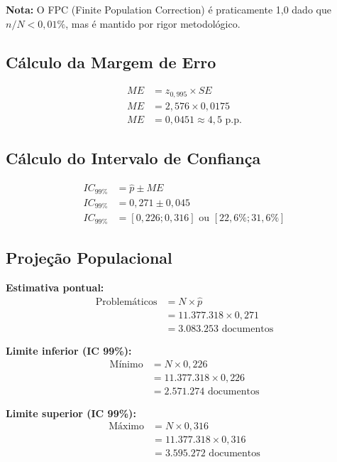 \documentclass[11pt,a4paper]{article}
\begin{document}
\textbf{Nota:} O FPC (Finite Population Correction) é praticamente 1,0 dado que $n/N < 0{,}01\%$, mas é mantido por rigor metodológico.

\subsection{Cálculo da Margem de Erro}

\begin{calculo}
\begin{align}
ME &= z_{0,995} \times SE \\[0.2cm]
ME &= 2{,}576 \times 0{,}0175 \\[0.2cm]
ME &= 0{,}0451 \approx 4{,}5\text{ p.p.}
\end{align}
\end{calculo}

\subsection{Cálculo do Intervalo de Confiança}

\begin{calculo}
\begin{align}
IC_{99\%} &= \hat{p} \pm ME \\[0.2cm]
IC_{99\%} &= 0{,}271 \pm 0{,}045 \\[0.2cm]
IC_{99\%} &= [0{,}226; 0{,}316] \text{ ou } [22{,}6\%; 31{,}6\%]
\end{align}
\end{calculo}

\subsection{Projeção Populacional}

\begin{calculo}
\textbf{Estimativa pontual:}
\begin{align}
\text{Problemáticos} &= N \times \hat{p} \\[0.2cm]
&= 11.377.318 \times 0{,}271 \\[0.2cm]
&= \mathbf{3.083.253} \text{ documentos}
\end{align}

\vspace{0.3cm}
\textbf{Limite inferior (IC 99\%):}
\begin{align}
\text{Mínimo} &= N \times 0{,}226 \\[0.2cm]
&= 11.377.318 \times 0{,}226 \\[0.2cm]
&= \mathbf{2.571.274} \text{ documentos}
\end{align}

\vspace{0.3cm}
\textbf{Limite superior (IC 99\%):}
\begin{align}
\text{Máximo} &= N \times 0{,}316 \\[0.2cm]
&= 11.377.318 \times 0{,}316 \\[0.2cm]
&= \mathbf{3.595.272} \text{ documentos}
\end{align}
\end{calculo}
\end{document}
